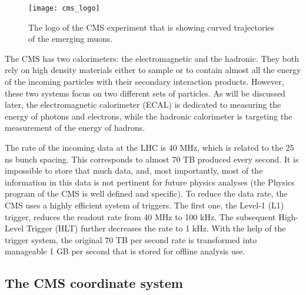 \begin{normalsize}
\begin{figure}[H]
  \centering
  \texttt{[image: cms\_logo]}
  \caption[The logo of the CMS experiment.]{The logo of the CMS experiment that is showing curved trajectories of the emerging muons.}
  \label{cms_logo}
\end{figure}


The CMS has two calorimeters: the electromagnetic and the hadronic. They both rely on high density materials either to sample or to contain almost all the energy of the incoming particles with their secondary interaction products. However, these two systems focus on two different sets of particles. As will be discussed later, the electromagnetic calorimeter (ECAL) is dedicated to measuring the energy of photons and electrons, while the hadronic calorimeter is targeting the measurement of the energy of hadrons.


The rate of the incoming data at the LHC is 40 MHz, which is related to the 25 ns bunch spacing. This corresponds to almost 70 TB produced every second. It is impossible to store that much data, and, most importantly, most of the information in this data is not pertinent for future physics analyses (the Physics program of the CMS is well defined and specific). To reduce the data rate, the CMS uses a highly efficient system of triggers. The first one, the Level-1 (L1) trigger, reduces the readout rate from 40 MHz to 100 kHz. The subsequent High-Level Trigger (HLT) further decreases the rate to 1 kHz. With the help of the trigger system, the original 70 TB per second rate is transformed into manageable 1 GB per second that is stored for offline analysis use. 




\subsection{The CMS coordinate system}


\end{normalsize}
